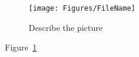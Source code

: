 \begin{figure}[h!]
	\centering
		\texttt{[image: Figures/FileName]}\\
	\caption{Describe the picture}
  \label{fig:LabelName}
\end{figure}
Figure~\ref{fig:LabelName}